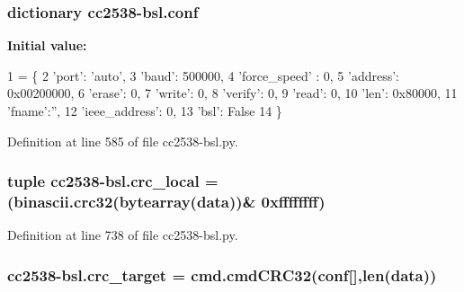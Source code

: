 \subsubsection[{\texorpdfstring{conf}{conf}}]{\setlength{\rightskip}{0pt plus 5cm}dictionary cc2538-\/bsl.\+conf}\hypertarget{namespacecc2538-bsl_a5d82f1abae2dbea8333124323281acf0}{}\label{namespacecc2538-bsl_a5d82f1abae2dbea8333124323281acf0}
{\bfseries Initial value\+:}
\begin{DoxyCode}
1 = \{
2             \textcolor{stringliteral}{'port'}: \textcolor{stringliteral}{'auto'},
3             \textcolor{stringliteral}{'baud'}: 500000,
4             \textcolor{stringliteral}{'force\_speed'} : 0,
5             \textcolor{stringliteral}{'address'}: 0x00200000,
6             \textcolor{stringliteral}{'erase'}: 0,
7             \textcolor{stringliteral}{'write'}: 0,
8             \textcolor{stringliteral}{'verify'}: 0,
9             \textcolor{stringliteral}{'read'}: 0,
10             \textcolor{stringliteral}{'len'}: 0x80000,
11             \textcolor{stringliteral}{'fname'}:\textcolor{stringliteral}{''},
12             \textcolor{stringliteral}{'ieee\_address'}: 0,
13             \textcolor{stringliteral}{'bsl'}: \textcolor{keyword}{False}
14         \}
\end{DoxyCode}


Definition at line 585 of file cc2538-\/bsl.\+py.

\subsubsection[{\texorpdfstring{crc\+\_\+local}{crc_local}}]{\setlength{\rightskip}{0pt plus 5cm}tuple cc2538-\/bsl.\+crc\+\_\+local = (binascii.\+crc32(bytearray({\bf data}))\& 0xffffffff)}\hypertarget{namespacecc2538-bsl_a660cdc1441c8f4f079e15d15c5f75418}{}\label{namespacecc2538-bsl_a660cdc1441c8f4f079e15d15c5f75418}


Definition at line 738 of file cc2538-\/bsl.\+py.

\subsubsection[{\texorpdfstring{crc\+\_\+target}{crc_target}}]{\setlength{\rightskip}{0pt plus 5cm}cc2538-\/bsl.\+crc\+\_\+target = cmd.\+cmd\+C\+R\+C32({\bf conf}\mbox{[}\textquotesingle{}\mbox{]},len({\bf data}))}\hypertarget{namespacecc2538-bsl_a6c6ffc33c40576c3092f41a76ea712d3}{}\label{namespacecc2538-bsl_a6c6ffc33c40576c3092f41a76ea712d3}


